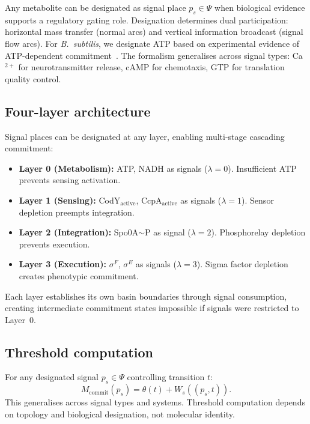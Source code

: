 \documentclass[11pt,a4paper]{article}
\theoremstyle{plain}
\theoremstyle{definition}
\begin{document}
Any metabolite can be designated as signal place $p_s \in \Psi$ when biological evidence supports a regulatory gating role. Designation determines dual participation: horizontal mass transfer (normal arcs) and vertical information broadcast (signal flow arcs). For \textit{B.~subtilis}, we designate ATP based on experimental evidence of ATP-dependent commitment~\cite{fujita2005}. The formalism generalises across signal types: Ca$^{2+}$ for neurotransmitter release, cAMP for chemotaxis, GTP for translation quality control.

\subsection{Four-layer architecture}

Signal places can be designated at any layer, enabling multi-stage cascading commitment:

\begin{itemize}
\item \textbf{Layer 0 (Metabolism):} ATP, NADH as signals ($\lambda = 0$). Insufficient ATP prevents sensing activation.
\item \textbf{Layer 1 (Sensing):} CodY$_{\mathrm{active}}$, CcpA$_{\mathrm{active}}$ as signals ($\lambda = 1$). Sensor depletion preempts integration.
\item \textbf{Layer 2 (Integration):} Spo0A$\sim$P as signal ($\lambda = 2$). Phosphorelay depletion prevents execution.
\item \textbf{Layer 3 (Execution):} $\sigma^F$, $\sigma^E$ as signals ($\lambda = 3$). Sigma factor depletion creates phenotypic commitment.
\end{itemize}

Each layer establishes its own basin boundaries through signal consumption, creating intermediate commitment states impossible if signals were restricted to Layer~0.

\subsection{Threshold computation}

For any designated signal $p_s \in \Psi$ controlling transition $t$:
\begin{equation}
M_{\mathrm{commit}}(p_s) = \theta(t) + W_s((p_s,t)).
\end{equation}
This generalises across signal types and systems. Threshold computation depends on topology and biological designation, not molecular identity.
\end{document}
